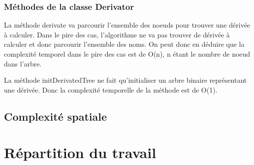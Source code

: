 \documentclass[11pt]{article}
\begin{document}
\subsubsection*{Méthodes de la classe Derivator}
La méthode derivate va parcourir l'ensemble des noeuds pour trouver une dérivée à calculer. Dans le pire des cas, l'algorithme ne va pas trouver de dérivée à calculer et donc parcourir l'ensemble des noms. On peut donc en déduire que la complexité temporel dans le pire des cas est de O(n), n étant le nombre de noeud dans l'arbre.

La méthode initDerivatedTree ne fait qu'initialiser un arbre binaire représentant une dérivée. Donc la complexité temporelle de la méthode est de O(1).
\subsection{Complexité spatiale}

\section{Répartition du travail}
\end{document}
